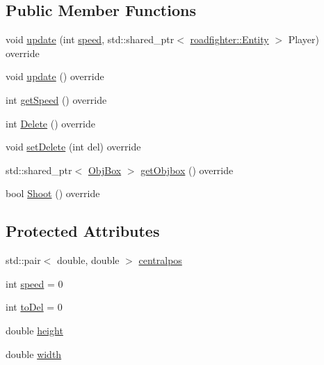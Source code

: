 \subsection*{Public Member Functions}
\begin{DoxyCompactItemize}
\item 
void \hyperlink{classroadfighter_1_1Rock_af9817c01175d300ca7be67e2b5e3952e}{update} (int \hyperlink{classroadfighter_1_1Rock_a6e25f8d74c9cba5a22da33bb24518063}{speed}, std\+::shared\+\_\+ptr$<$ \hyperlink{classroadfighter_1_1Entity}{roadfighter\+::\+Entity} $>$ Player) override
\item 
void \hyperlink{classroadfighter_1_1Rock_a28d9c3334f54db88785696076a8b6c9c}{update} () override
\item 
int \hyperlink{classroadfighter_1_1Rock_ab3f596c927c49ab4b159391dc7287192}{get\+Speed} () override
\item 
int \hyperlink{classroadfighter_1_1Rock_a7ac4934b909f1f988b64ac8afc84ea85}{Delete} () override
\item 
void \hyperlink{classroadfighter_1_1Rock_ae2cef1d49610edd8b0438b6c84fdabfd}{set\+Delete} (int del) override
\item 
std\+::shared\+\_\+ptr$<$ \hyperlink{structObjBox}{Obj\+Box} $>$ \hyperlink{classroadfighter_1_1Rock_a286656165c7dd3cdf66945e47f6fa4c7}{get\+Objbox} () override
\item 
bool \hyperlink{classroadfighter_1_1Rock_a1bcf89f9c386a3b248033ba3f0329e9c}{Shoot} () override
\end{DoxyCompactItemize}
\subsection*{Protected Attributes}
\begin{DoxyCompactItemize}
\item 
std\+::pair$<$ double, double $>$ \hyperlink{classroadfighter_1_1Rock_a31327b11d04ef2d368acf12dcffbf21d}{centralpos}
\item 
int \hyperlink{classroadfighter_1_1Rock_a6e25f8d74c9cba5a22da33bb24518063}{speed} = 0
\item 
int \hyperlink{classroadfighter_1_1Rock_a335c9ad9f6931075b34bfa15adf15fa6}{to\+Del} = 0
\item 
double \hyperlink{classroadfighter_1_1Rock_a5551bc7292d6e01a3893128eba4ca4f1}{height}
\item 
double \hyperlink{classroadfighter_1_1Rock_a68752ff27db401333fa3e0e1a504213d}{width}
\end{DoxyCompactItemize}


